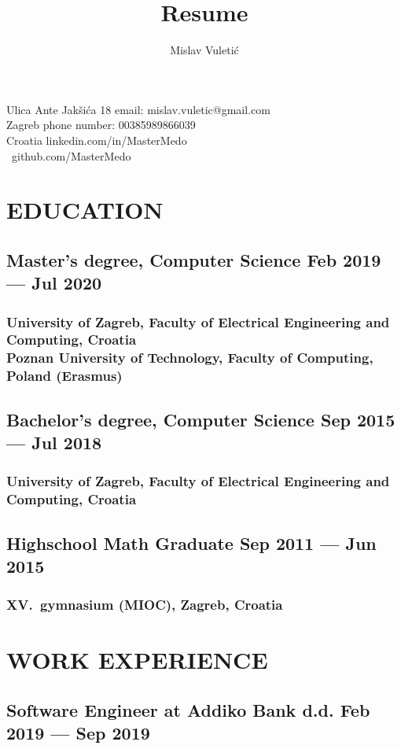 \documentclass{article}
\begin{document}
\title{Resume}
\author{Mislav Vuletić}

\noindent \Huge\bfseries\theauthor\mdseries\large

\noindent Ulica Ante Jakšića 18 \hfill email: mislav.vuletic@gmail.com
\\ Zagreb \hfill phone number: 00385989866039
\\\noindent Croatia \hfill linkedin.com/in/MasterMedo
\\\-\ \hfill github.com/MasterMedo

\section{EDUCATION}
\subsection{Master's degree, Computer Science \hfill Feb 2019 --- Jul 2020}
\subsubsection{University of Zagreb, Faculty of Electrical Engineering and Computing, Croatia
  \\Poznan University of Technology, Faculty of Computing, Poland (Erasmus)}
\subsection{Bachelor's degree, Computer Science \hfill Sep 2015 --- Jul 2018}
\subsubsection{University of Zagreb, Faculty of Electrical Engineering and Computing, Croatia}
\subsection{Highschool Math Graduate \hfill Sep 2011 --- Jun 2015}
\subsubsection{XV.\ gymnasium (MIOC), Zagreb, Croatia}

\section{WORK EXPERIENCE}
\subsection{Software Engineer at Addiko Bank d.d. \hfill Feb 2019 --- Sep 2019}
\end{document}
